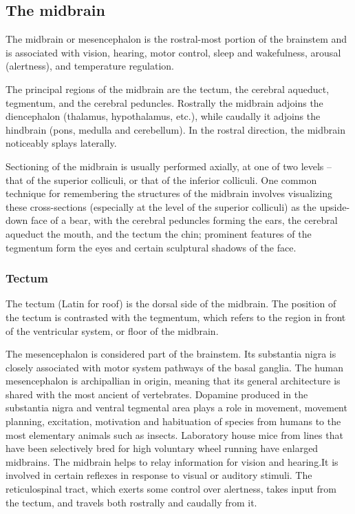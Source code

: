 \hypertarget{the-midbrain}{%
\subsection{The midbrain}\label{the-midbrain}}

The midbrain or mesencephalon is the rostral-most portion of the brainstem and is associated with vision, hearing, motor control, sleep and wakefulness, arousal (alertness), and temperature regulation.

The principal regions of the midbrain are the tectum, the cerebral aqueduct, tegmentum, and the cerebral peduncles. Rostrally the midbrain adjoins the diencephalon (thalamus, hypothalamus, etc.), while caudally it adjoins the hindbrain (pons, medulla and cerebellum). In the rostral direction, the midbrain noticeably splays laterally.

Sectioning of the midbrain is usually performed axially, at one of two levels -- that of the superior colliculi, or that of the inferior colliculi. One common technique for remembering the structures of the midbrain involves visualizing these cross-sections (especially at the level of the superior colliculi) as the upside-down face of a bear, with the cerebral peduncles forming the ears, the cerebral aqueduct the mouth, and the tectum the chin; prominent features of the tegmentum form the eyes and certain sculptural shadows of the face.

\hypertarget{tectum}{%
\subsubsection{Tectum}\label{tectum}}

The tectum (Latin for roof) is the dorsal side of the midbrain. The position of the tectum is contrasted with the tegmentum, which refers to the region in front of the ventricular system, or floor of the midbrain.

The mesencephalon is considered part of the brainstem. Its substantia nigra is closely associated with motor system pathways of the basal ganglia. The human mesencephalon is archipallian in origin, meaning that its general architecture is shared with the most ancient of vertebrates. Dopamine produced in the substantia nigra and ventral tegmental area plays a role in movement, movement planning, excitation, motivation and habituation of species from humans to the most elementary animals such as insects. Laboratory house mice from lines that have been selectively bred for high voluntary wheel running have enlarged midbrains. The midbrain helps to relay information for vision and hearing.It is involved in certain reflexes in response to visual or auditory stimuli. The reticulospinal tract, which exerts some control over alertness, takes input from the tectum, and travels both rostrally and caudally from it.

